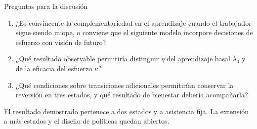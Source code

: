 \documentclass[aspectratio=169,11pt]{beamer}
\begin{document}
\begin{frame}{Preguntas para la discusión}
  \begin{enumerate}
    \item ¿Es convincente la complementariedad en el aprendizaje cuando el
    trabajador sigue siendo miope, o conviene que el siguiente modelo
    incorpore decisiones de esfuerzo con visión de futuro?
    \par\medskip
    \item ¿Qué resultado observable permitiría distinguir $\eta$ del aprendizaje
    basal $\lambda_0$ y de la eficacia del esfuerzo $\kappa$?
    \par\medskip
    \item ¿Qué condiciones sobre transiciones adicionales permitirían conservar
    la reversión en tres estados, y qué resultado de bienestar debería acompañarla?
  \end{enumerate}
  \par\medskip
  El resultado demostrado pertenece a dos estados y a asistencia fija.
  La extensión a más estados y el diseño de políticas quedan abiertos.
\end{frame}
\end{document}
